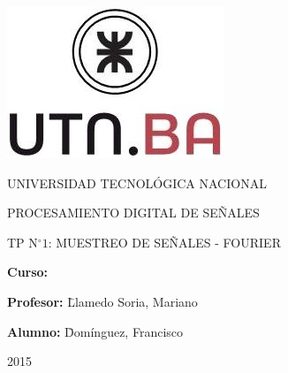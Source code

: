 \begin{titlepage}
\vspace*{\fill}

\begin{center}
\includegraphics[scale=1.1]{./Img/utnba.jpg}
\end{center}


\begin{center}
\begin{huge}
UNIVERSIDAD TECNOLÓGICA NACIONAL
\end{huge}
\end{center}

\vspace*{0.2in}

\begin{center}
\begin{huge}
PROCESAMIENTO DIGITAL DE SEÑALES\\
\end{huge}
\end{center}
\vspace*{0.4in}
\begin{center}
\begin{huge}
TP N$^{\circ}1$: MUESTREO DE SEÑALES - FOURIER\\
\end{huge}
\end{center}
\vspace*{0.7in}
\begin{flushleft}
\textbf{{\large Curso: }}\large{ }
\vspace*{0.2in}
\begin{tabbing}
\textbf{{\large Profesor: }}\= Llamedo Soria, Mariano\\
\end{tabbing}
\begin{tabbing}
\textbf{{\large Alumno: }}\= Domínguez, Francisco\\
\end{tabbing}
\end{flushleft}
\begin{center}
2015
\end{center}
\vspace*{\fill}
\end{titlepage}
\clearpage